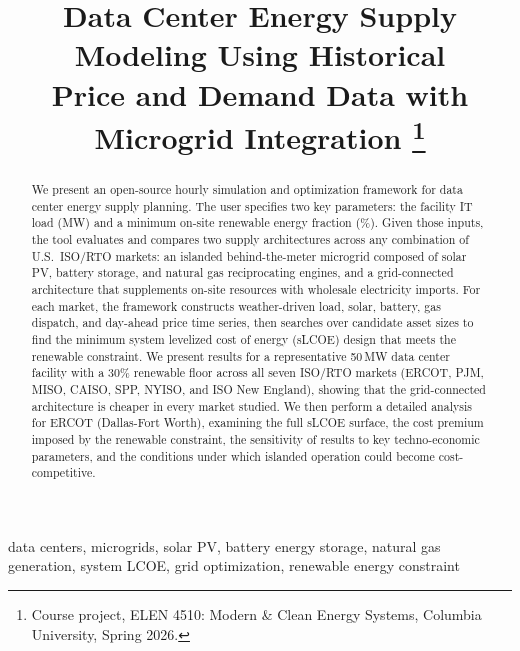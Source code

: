 \documentclass[conference]{IEEEtran}
\begin{document}
\title{Data Center Energy Supply Modeling Using Historical\\
Price and Demand Data with Microgrid Integration%
\thanks{Course project, ELEN 4510: Modern \& Clean Energy Systems,
Columbia University, Spring 2026.}}

\author{
}

\maketitle

\begin{abstract}
We present an open-source hourly simulation and optimization framework for
data center energy supply planning.
The user specifies two key parameters: the facility IT load (MW) and a
minimum on-site renewable energy fraction (\%).
Given those inputs, the tool evaluates and compares two supply architectures
across any combination of U.S.\ ISO/RTO markets: an islanded behind-the-meter
microgrid composed of solar PV, battery storage, and natural gas reciprocating
engines, and a grid-connected architecture that supplements on-site resources
with wholesale electricity imports.
For each market, the framework constructs weather-driven load, solar, battery,
gas dispatch, and day-ahead price time series, then searches over candidate
asset sizes to find the minimum system levelized cost of energy (sLCOE) design
that meets the renewable constraint.
We present results for a representative 50\,MW data center facility with a
30\% renewable floor across all seven ISO/RTO markets (ERCOT, PJM, MISO,
CAISO, SPP, NYISO, and ISO New England), showing that the grid-connected
architecture is cheaper in every market studied.
We then perform a detailed analysis for ERCOT (Dallas-Fort Worth), examining
the full sLCOE surface, the cost premium imposed by the renewable constraint,
the sensitivity of results to key techno-economic parameters, and the
conditions under which islanded operation could become cost-competitive.
\end{abstract}

\begin{IEEEkeywords}
data centers, microgrids, solar PV, battery energy storage, natural gas
generation, system LCOE, grid optimization, renewable energy constraint
\end{IEEEkeywords}
\end{document}
